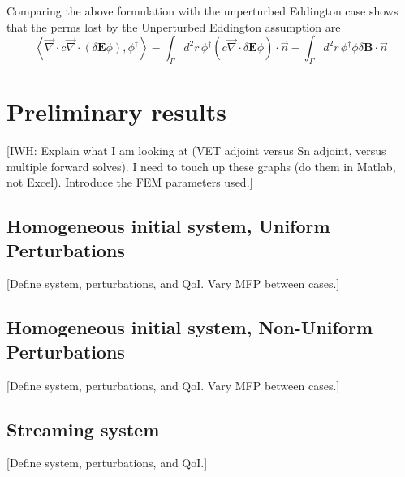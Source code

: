 \documentclass{article}
\newcommand{\bra}{\left\langle}
\newcommand{\ket}{\right\rangle}
\newcommand{\vdiv}{\vec{\nabla} \cdot}
\newcommand{\Edd}{\mathbf{E}}
\newcommand{\BEdd}{\mathbf{B}}
\newcommand{\isigt}{c}
\begin{document}
Comparing the above formulation with the unperturbed Eddington case shows that the perms lost by the Unperturbed Eddington assumption are 
\begin{equation}
\label{EddErr}
 \bra \vdiv \isigt \vdiv \left( \delta \Edd \phi \right), \phi^\dag \ket
- \int_\Gamma d^2 r \,  \phi^\dag \left( \isigt \vdiv \delta \Edd \phi \right) \cdot \vec{n}
- \int_\Gamma d^2 r \,  \phi^\dag \phi \delta \BEdd \cdot \vec{n}
\end{equation} 

\section{Preliminary results}
{\color{red}[IWH: Explain what I am looking at (VET adjoint versus Sn adjoint, versus multiple forward solves). I need to touch up these graphs (do them in Matlab, not Excel). Introduce the FEM parameters used.]}
\subsection{Homogeneous initial system, Uniform Perturbations}
[Define system,  perturbations, and QoI. Vary MFP between cases.]

\subsection{Homogeneous initial system, Non-Uniform Perturbations}
[Define system,  perturbations, and QoI. Vary MFP between cases.]

\subsection{Streaming system}
[Define system,  perturbations, and QoI.]
\end{document}

